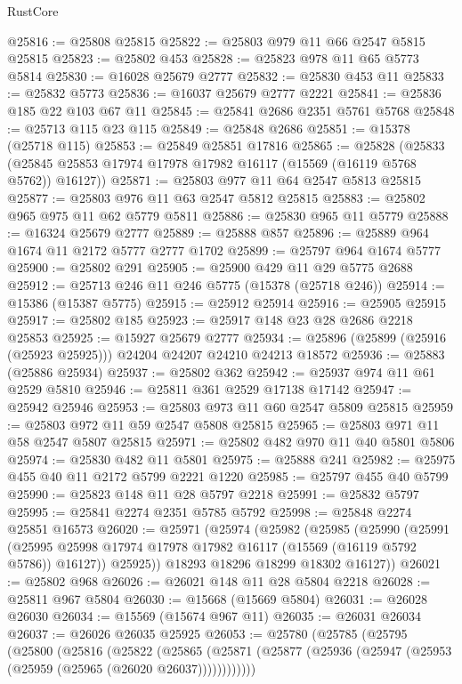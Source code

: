 \begin{lexlean}{RustCore}
\begin{coremodule}
@25816 := @25808 @25815
@25822 := @25803 @979 @11 @66 @2547 @5815 @25815
@25823 := @25802 @453
@25828 := @25823 @978 @11 @65 @5773 @5814
@25830 := @16028 @25679 @2777
@25832 := @25830 @453 @11
@25833 := @25832 @5773
@25836 := @16037 @25679 @2777 @2221
@25841 := @25836 @185 @22 @103 @67 @11
@25845 := @25841 @2686 @2351 @5761 @5768
@25848 := @25713 @115 @23 @115
@25849 := @25848 @2686
@25851 := @15378 (@25718 @115)
@25853 := @25849 @25851 @17816
@25865 := @25828
    (@25833 (@25845 @25853 @17974 @17978 @17982 @16117 (@15569 (@16119 @5768 @5762)) @16127))
@25871 := @25803 @977 @11 @64 @2547 @5813 @25815
@25877 := @25803 @976 @11 @63 @2547 @5812 @25815
@25883 := @25802 @965 @975 @11 @62 @5779 @5811
@25886 := @25830 @965 @11 @5779
@25888 := @16324 @25679 @2777
@25889 := @25888 @857
@25896 := @25889 @964 @1674 @11 @2172 @5777 @2777 @1702
@25899 := @25797 @964 @1674 @5777
@25900 := @25802 @291
@25905 := @25900 @429 @11 @29 @5775 @2688
@25912 := @25713 @246 @11 @246 @5775 (@15378 (@25718 @246))
@25914 := @15386 (@15387 @5775)
@25915 := @25912 @25914
@25916 := @25905 @25915
@25917 := @25802 @185
@25923 := @25917 @148 @23 @28 @2686 @2218 @25853
@25925 := @15927 @25679 @2777
@25934 := @25896 (@25899 (@25916 (@25923 @25925))) @24204 @24207 @24210 @24213 @18572
@25936 := @25883 (@25886 @25934)
@25937 := @25802 @362
@25942 := @25937 @974 @11 @61 @2529 @5810
@25946 := @25811 @361 @2529 @17138 @17142
@25947 := @25942 @25946
@25953 := @25803 @973 @11 @60 @2547 @5809 @25815
@25959 := @25803 @972 @11 @59 @2547 @5808 @25815
@25965 := @25803 @971 @11 @58 @2547 @5807 @25815
@25971 := @25802 @482 @970 @11 @40 @5801 @5806
@25974 := @25830 @482 @11 @5801
@25975 := @25888 @241
@25982 := @25975 @455 @40 @11 @2172 @5799 @2221 @1220
@25985 := @25797 @455 @40 @5799
@25990 := @25823 @148 @11 @28 @5797 @2218
@25991 := @25832 @5797
@25995 := @25841 @2274 @2351 @5785 @5792
@25998 := @25848 @2274 @25851 @16573
@26020 := @25971
    (@25974
      (@25982
        (@25985
          (@25990
            (@25991
              (@25995 @25998 @17974 @17978 @17982 @16117 (@15569 (@16119 @5792 @5786)) @16127))
            @25925))
        @18293
        @18296
        @18299
        @18302
        @16127))
@26021 := @25802 @968
@26026 := @26021 @148 @11 @28 @5804 @2218
@26028 := @25811 @967 @5804
@26030 := @15668 (@15669 @5804)
@26031 := @26028 @26030
@26034 := @15569 (@15674 @967 @11)
@26035 := @26031 @26034
@26037 := @26026 @26035 @25925
@26053 := @25780
    (@25785
      (@25795
        (@25800
          (@25816
            (@25822
              (@25865
                (@25871 (@25877 (@25936 (@25947 (@25953 (@25959 (@25965 (@26020 @26037))))))))))))

\end{coremodule}
\end{lexlean}
